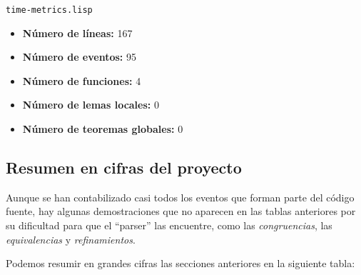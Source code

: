 \documentclass[a4paper,10pt]{article}
\begin{document}
\par \vspace{24pt}
\texttt{time-metrics.lisp}

\par \vspace{10pt}

\begin{itemize}
	\item \textbf{Número de líneas:} 167
	\item \textbf{Número de eventos:} 95
	\item \textbf{Número de funciones:} 4
	\item \textbf{Número de lemas locales:} 0
	\item \textbf{Número de teoremas globales:} 0
\end{itemize}

\vspace{24pt}
\subsection{Resumen en cifras del proyecto}

Aunque se han contabilizado casi todos los eventos que forman parte del código fuente, hay algunas demostraciones que no aparecen en las tablas anteriores por su dificultad para que el ``parser'' las encuentre, como las \emph{congruencias}, las \emph{equivalencias} y \emph{refinamientos}.

\par \vspace{10pt}

Podemos resumir en grandes cifras las secciones anteriores en la siguiente tabla:
\end{document}
